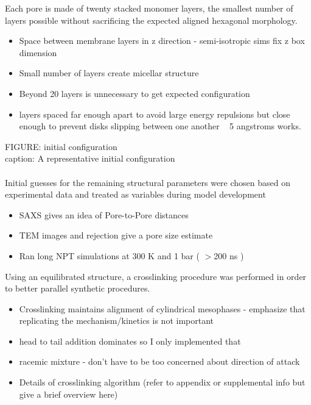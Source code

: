 \documentclass{article}
\begin{document}
	Each pore is made of twenty stacked monomer layers, the smallest number of layers possible without sacrificing the expected aligned hexagonal morphology.
	\begin{itemize}
		\item Space between membrane layers in z direction - semi-isotropic sims fix z box dimension
		\item Small number of layers create micellar structure %
		\item Beyond 20 layers is unnecessary to get expected configuration
		\item layers spaced far enough apart to avoid large energy repulsions but close enough to prevent disks slipping between one another ~ 5 angstroms works.
	\end{itemize}
	FIGURE: initial configuration \\
	caption: A representative initial configuration \\
	\\
	\noindent Initial guesses for the remaining structural parameters were chosen based on experimental data and treated as variables during model development 
	\begin{itemize}
		\item SAXS gives an idea of Pore-to-Pore distances
		\item TEM images and rejection give a pore size estimate
		\item Ran long NPT simulations at 300 K and 1 bar ( $>$200 ns )
	\end{itemize}
	
	Using an equilibrated structure, a crosslinking procedure was performed in order to better parallel synthetic procedures. 
	\begin{itemize}
		\item Crosslinking maintains alignment of cylindrical mesophases - emphasize that replicating the mechanism/kinetics is not important 
		\item head to tail addition dominates so I only implemented that
		\item racemic mixture - don't have to be too concerned about direction of attack 
		\item Details of crosslinking algorithm (refer to appendix or supplemental info but give a brief overview here)
	\end{itemize}  
	
\end{document}
